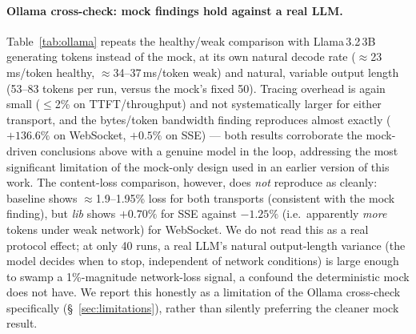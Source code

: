 \documentclass[11pt]{article}
\begin{document}
\paragraph{Ollama cross-check: mock findings hold against a real LLM.} Table~\ref{tab:ollama} repeats the healthy/weak comparison with Llama\,3.2\,3B generating tokens instead of the mock, at its own natural decode rate ($\approx$23\,ms/token healthy, $\approx$34--37\,ms/token weak) and natural, variable output length (53--83 tokens per run, versus the mock's fixed 50). Tracing overhead is again small ($\le$2\% on TTFT/throughput) and not systematically larger for either transport, and the bytes/token bandwidth finding reproduces almost exactly ($+136.6\%$ on WebSocket, $+0.5\%$ on SSE) --- both results corroborate the mock-driven conclusions above with a genuine model in the loop, addressing the most significant limitation of the mock-only design used in an earlier version of this work. The content-loss comparison, however, does \emph{not} reproduce as cleanly: baseline shows $\approx$1.9--1.95\% loss for both transports (consistent with the mock finding), but \emph{lib} shows $+0.70\%$ for SSE against $-1.25\%$ (i.e.\ apparently \emph{more} tokens under weak network) for WebSocket. We do not read this as a real protocol effect; at only 40 runs, a real LLM's natural output-length variance (the model decides when to stop, independent of network conditions) is large enough to swamp a 1\%-magnitude network-loss signal, a confound the deterministic mock does not have. We report this honestly as a limitation of the Ollama cross-check specifically (\S~\ref{sec:limitations}), rather than silently preferring the cleaner mock result.
\end{document}
